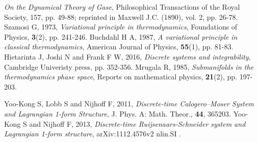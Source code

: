 \documentclass[12pt]{article}
\numberwithin{equation}{section}
\theoremstyle{remark}
\theoremstyle{definition}
\begin{document}
\begin{thebibliography}{}
\emph{On the Dynamical Theory of Gase}, Philosophical Transactions of the Royal Society, 157, pp. 49-88; reprinted in Maxwell J.C. (1890), vol. 2, pp. 26-78.
%
%
Szamosi G, 1973, 
\emph{Variational principle in thermodynamics}, Foundations of Physics, \textbf{3}(2), pp. 241-246.
%
%
Buchdahl H A, 1987, 
\emph{A variational principle in classical thermodynamics}, American Journal of Physics, \textbf{55}(1), pp. 81-83.
%
%
Hietarinta J, Joshi  N and Frank F W, 2016, 
\emph{Discrete systems and integrability}, Cambridge Univeristy press, pp. 352-356.
%
Mrugala R, 1985, 
\emph{Submanifolds in the thermodynamics phase space}, 
Reports on mathematical physics, \textbf{21}(2), pp. 197-203.
%

Yoo-Kong S, Lobb S and Nijhoff F, 2011, 
\emph{Discrete-time Calogero–Moser System and Lagrangian 1-form Structure}, 
J. Phys. A: Math. Theor., \textbf{44}, 365203.
%
Yoo-Kong S and Nijhoff F, 2013, 
\emph{Discrete-time Ruijsenaars-Schneider system and Lagrangian 1-form structure}, 
arXiv:1112.4576v2 nlin.SI .
%






\end{thebibliography} 
\end{document}
